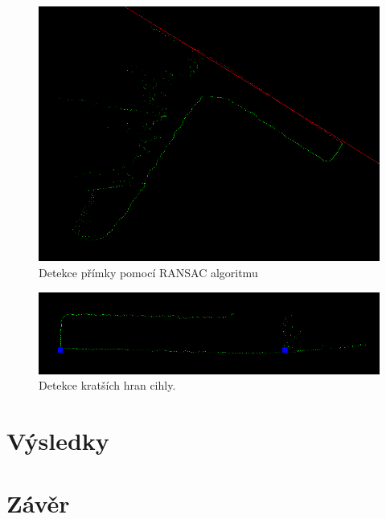 \documentclass[twoside]{ctuthesis}
\begin{document}
\begin{figure}
    \centering
    \includegraphics[width = \linewidth]{pictures/ransac_rect_fit1.png}
    \caption{Detekce přímky pomocí RANSAC algoritmu}
    \label{fig:RANSAC_line}
\end{figure}

\begin{figure}
    \centering
    \includegraphics[width = \linewidth]{pictures/crop_ransac_rot.png}
    \caption{Detekce kratších hran cihly.}
    \label{fig:RANSAC_line_short}
\end{figure}

\chapter{Výsledky}
\label{sec:výsledky}

\chapter{Závěr}
\label{sec:závěr}




\end{document}
